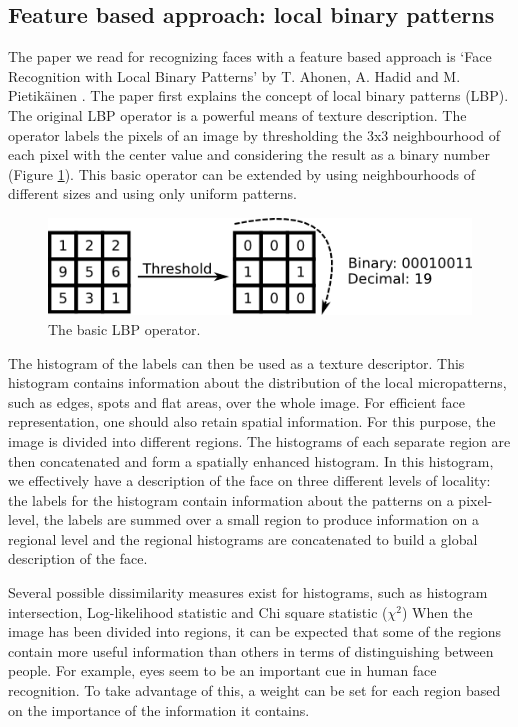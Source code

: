 \documentclass[]{article}
\begin{document}
\subsection{Feature based approach: local binary patterns}
The paper we read for recognizing faces with a feature based approach is `Face Recognition with Local Binary Patterns' by T. Ahonen, A. Hadid and M. Pietikäinen \cite{ahonen2004face}.
The paper first explains the concept of local binary patterns (LBP). The original LBP operator is a powerful means of texture description. The operator labels the pixels of an image by thresholding the 3x3 neighbourhood of each pixel with the center value and considering the result as a binary number (Figure \ref{fig:lbp-explained}). This basic operator can be extended by using neighbourhoods of different sizes and using only uniform patterns.
\begin{figure}
\centering
\includegraphics{lbp_explained.png}
\caption{The basic LBP operator.}
\label{fig:lbp-explained}
\end{figure}

The histogram of the labels can then be used as a texture descriptor. This histogram contains information about the distribution of the local micropatterns, such as edges, spots and flat areas, over the whole image. For efficient face representation, one should also retain spatial information. For this purpose, the image is divided into different regions. The histograms of each separate region are then concatenated and form a spatially enhanced histogram. In this histogram, we effectively have a description of the face on three different levels of locality: the labels for the histogram contain information about the patterns on a pixel-level, the labels are summed over a small region to produce information on a regional level and the regional histograms are concatenated to build a global description of the face.

Several possible dissimilarity measures exist for histograms, such as histogram intersection, Log-likelihood statistic and Chi square statistic ($\chi^2$) When the image has been divided into regions, it can be expected that some of the regions contain more useful information than others in terms of distinguishing between people. For example, eyes seem to be an important cue in human face recognition. To take advantage of this, a weight can be set for each region based on the importance of the information it contains. 
\end{document}
